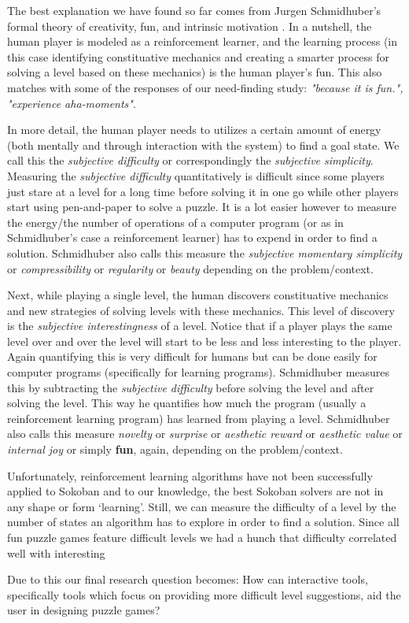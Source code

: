 The best explanation we have found so far comes from Jurgen Schmidhuber's formal theory of creativity, fun, and intrinsic motivation \cite{Schmidhuber}. In a nutshell, the human player is modeled as a reinforcement learner, and the learning process (in this case identifying constituative mechanics and creating a smarter process for solving a level based on these mechanics) is the human player's fun. This also matches with some of the responses of our need-finding study: \textit{"because it is fun.", "experience aha-moments"}.

In more detail, the human player needs to utilizes a certain amount of energy (both mentally and through interaction with the system) to find a goal state. We call this the \textit{subjective difficulty} or correspondingly the \textit{subjective simplicity}. Measuring the \textit{subjective difficulty} quantitatively is difficult since some players just stare at a level for a long time before solving it in one go while other players start using pen-and-paper to solve a puzzle. It is a lot easier however to measure the energy/the number of operations of a computer program (or as in Schmidhuber's case a reinforcement learner) has to expend in order to find a solution. Schmidhuber also calls this measure the \textit{subjective momentary simplicity} or \textit{compressibility} or \textit{regularity} or \textit{beauty} depending on the problem/context.

Next, while playing a single level, the human discovers constituative mechanics and new strategies of solving levels with these mechanics. This level of discovery is the \textit{subjective interestingness} of a level. Notice that if a player plays the same level over and over the level will start to be less and less interesting to the player. Again quantifying this is very difficult for humans but can be done easily for computer programs (specifically for learning programs). Schmidhuber measures this by subtracting the \textit{subjective difficulty} before solving the level and after solving the level. This way he quantifies how much the program (usually a reinforcement learning program) has learned from playing a level. Schmidhuber also calls this measure \textit{novelty} or \textit{surprise} or \textit{aesthetic reward} or \textit{aesthetic value} or \textit{internal joy} or simply \textbf{fun}, again, depending on the problem/context.

Unfortunately, reinforcement learning algorithms have not been successfully applied to Sokoban and to our knowledge, the best Sokoban solvers are not in any shape or form `learning'. Still, we can measure the difficulty of a level by the number of states an algorithm has to explore in order to find a solution.
Since all fun puzzle games feature difficult levels we had a hunch that difficulty correlated well with interesting 

Due to this our final research question becomes: How can interactive tools, specifically tools which focus on providing more difficult level suggestions, aid the user in designing puzzle games?